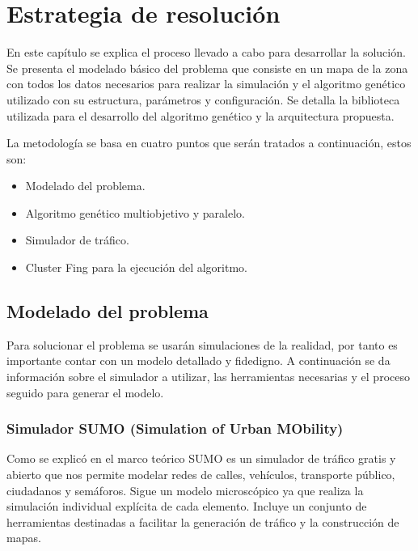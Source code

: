 \chapter{Estrategia de resolución}

En este capítulo se explica el proceso llevado a cabo para desarrollar la solución. Se presenta el modelado básico del problema que consiste en un mapa de la zona con todos los datos necesarios para realizar la simulación y el algoritmo genético utilizado con su estructura, parámetros y configuración. Se detalla la biblioteca utilizada para el desarrollo del algoritmo genético y la arquitectura propuesta.

La metodología se basa en cuatro puntos que serán tratados a continuación, estos son:

\begin{itemize}
	\item Modelado del problema.
	\item Algoritmo genético multiobjetivo y paralelo.
	\item Simulador de tráfico.
	\item Cluster Fing para la ejecución del algoritmo. 
\end{itemize}





\section{Modelado del problema }

Para solucionar el problema se usarán simulaciones de la realidad, por tanto es importante contar con un modelo detallado y fidedigno. A continuación se da información sobre el simulador a utilizar, las herramientas necesarias y el proceso seguido para generar el modelo. 

\subsection{Simulador SUMO (Simulation of Urban MObility)}

Como se explicó en el marco teórico SUMO es un simulador de tráfico gratis y abierto que nos permite modelar redes de calles, vehículos, transporte público, ciudadanos y semáforos. Sigue un modelo microscópico ya que realiza la simulación individual explícita de cada elemento. Incluye un conjunto de herramientas destinadas  a facilitar la generación de tráfico y la construcción de mapas. 

